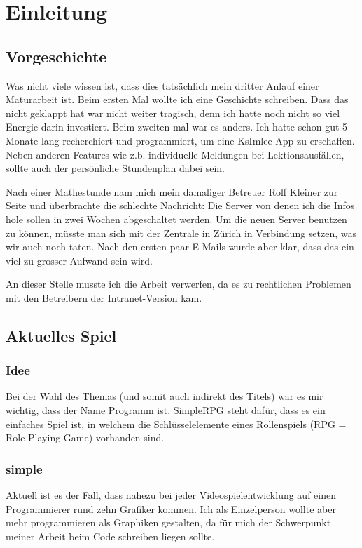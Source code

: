 \chapter{Einleitung}

\section{Vorgeschichte}
Was nicht viele wissen ist, dass dies tatsächlich mein dritter Anlauf einer Maturarbeit ist.
Beim ersten Mal wollte ich eine Geschichte schreiben.
Dass das nicht geklappt hat war nicht weiter tragisch, denn ich hatte noch nicht so viel Energie darin investiert.
Beim zweiten mal war es anders.
Ich hatte schon gut 5 Monate lang recherchiert und programmiert, um eine KsImlee-App zu erschaffen.
Neben anderen Features wie z.b. individuelle Meldungen bei Lektionsausfällen, sollte auch der persönliche Stundenplan dabei sein.

Nach einer Mathestunde nam mich mein damaliger Betreuer Rolf Kleiner zur Seite und überbrachte die schlechte Nachricht: Die Server von denen ich die Infos hole sollen in zwei Wochen abgeschaltet werden. Um die neuen Server benutzen zu können, müsste man sich mit der Zentrale in Zürich in Verbindung setzen, was wir auch noch taten.
Nach den ersten paar E-Mails wurde aber klar, dass das ein viel zu grosser Aufwand sein wird.

An dieser Stelle musste ich die Arbeit verwerfen, da es zu rechtlichen Problemen mit den Betreibern der Intranet-Version kam.

\section{Aktuelles Spiel}
\subsection{Idee}
Bei der Wahl des Themas (und somit auch indirekt des Titels) war es mir wichtig, dass der Name Programm ist.
SimpleRPG steht dafür, dass es ein einfaches Spiel ist, in welchem die Schlüsselelemente eines Rollenspiels (RPG = Role Playing Game) vorhanden sind.

\subsection{simple}
Aktuell ist es der Fall, dass nahezu bei jeder Videospielentwicklung auf einen Programmierer rund zehn Grafiker kommen.
Ich als Einzelperson wollte aber mehr programmieren als Graphiken gestalten, da für mich der Schwerpunkt meiner Arbeit beim Code schreiben liegen sollte.

